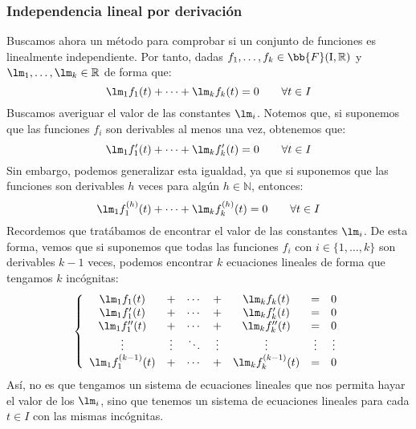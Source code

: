 \subsubsection{Independencia lineal por derivación}
Buscamos ahora un método para comprobar si un conjunto de funciones es linealmente independiente. Por tanto, dadas $f_1,\ldots,f_k\in \bb{F}(\text{I},\mathbb{R})$ y $\lm_1,\ldots,\lm_k\in \mathbb{R}$ de forma que:
\begin{equation*}
    \lm_1 f_1(t) + \cdots + \lm_k f_k(t) = 0 \qquad \forall t\in I
\end{equation*}
Buscamos averiguar el valor de las constantes $\lm_i$. Notemos que, si suponemos que las funciones $f_i$ son derivables al menos una vez, obtenemos que:
\begin{equation*}
    \lm_1 f_1'(t) + \cdots + \lm_k f_k'(t) = 0 \qquad \forall t\in I
\end{equation*}
Sin embargo, podemos generalizar esta igualdad, ya que si suponemos que las funciones son derivables $h$ veces para algún $h\in \mathbb{N}$, entonces:
\begin{equation*}
    \lm_1 f_1^{(h)}(t) + \cdots + \lm_k f_k^{(h)}(t) = 0 \qquad \forall t\in I
\end{equation*}
Recordemos que tratábamos de encontrar el valor de las constantes $\lm_i$. De esta forma, vemos que si suponemos que todas las funciones $f_i$ con $i \in \{1,\ldots,k\}$ son derivables $k-1$ veces, podemos encontrar $k$ ecuaciones lineales de forma que tengamos $k$ incógnitas:
\begin{equation*}
    \left\{\begin{array}{ccccccc}
            \lm_1 f_1(t) &+& \cdots &+& \lm_k f_k(t) &=& 0 \\
            \lm_1 f_1'(t) &+& \cdots &+& \lm_k f_k'(t) &=& 0 \\
            \lm_1 f_1''(t) &+& \cdots &+& \lm_k f_k''(t) &=& 0 \\
            \vdots & \vdots & \ddots & \vdots & \vdots & \vdots & \vdots \\
            \lm_1 f_1^{(k-1)}(t) &+& \cdots &+& \lm_k f_k^{(k-1)}(t) &=& 0 
    \end{array}\right.
\end{equation*}
Así, no es que tengamos un sistema de ecuaciones lineales que nos permita hayar el valor de los $\lm_i$, sino que tenemos un sistema de ecuaciones lineales para cada $t\in I$ con las mismas incógnitas.\\

